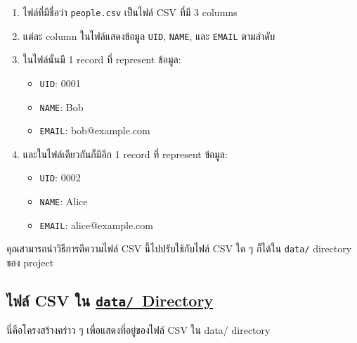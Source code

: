 \begin{enumerate}
    \item ไฟล์ที่มีชื่อว่า \texttt{people.csv} เป็นไฟล์ CSV ที่มี 3 columns
    \item แต่ละ column ในไฟล์แสดงข้อมูล \texttt{UID}, \texttt{NAME}, และ \texttt{EMAIL} ตามลำดับ
    \item ในไฟล์นั้นมี 1 record ที่ represent ข้อมูล:
        \begin{itemize}
            \item \texttt{UID}: 0001
            \item \texttt{NAME}: Bob
            \item \texttt{EMAIL}: bob@example.com
        \end{itemize}
    \item และในไฟล์เดียวกันก็มีอีก 1 record ที่ represent ข้อมูล:
        \begin{itemize}
            \item \texttt{UID}: 0002
            \item \texttt{NAME}: Alice
            \item \texttt{EMAIL}: alice@example.com
        \end{itemize}
\end{enumerate}

คุณสามารถนำวิธีการตีความไฟล์ CSV นี้ไปปรับใช้กับไฟล์ CSV ใด ๆ ก็ได้ใน \texttt{data/} directory ของ project

\clearpage

\subsection{ไฟล์ CSV ใน \href{https://github.com/CS211-651/project211-oakcoding/tree/9397d355461933fb007261e2ee97445ea93eacc1/data}{\texttt{data\slash}~Directory}}

นี่คือโครงสร้างคร่าว ๆ เพื่อแสดงที่อยู่ของไฟล์ CSV ใน data/ directory

